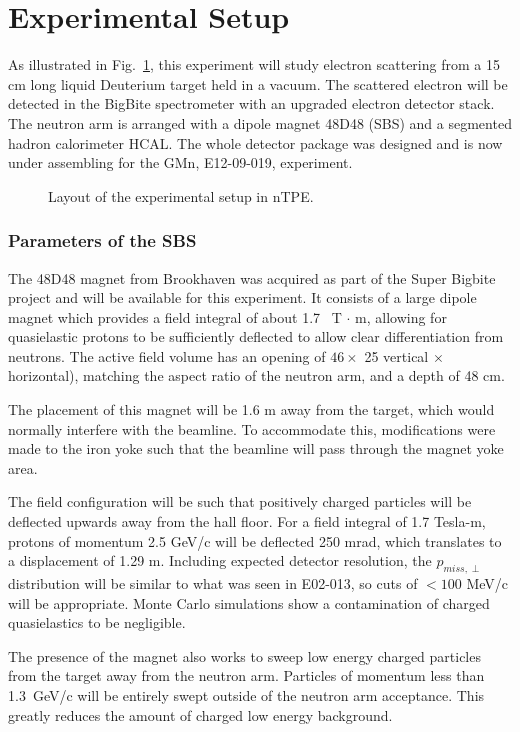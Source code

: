 \section{Experimental Setup}
%
\label{sec:expsetup}

As illustrated in Fig.~\ref{pic:expsetup}, this experiment will study electron scattering from a 15 cm long 
liquid Deuterium target held in a vacuum.
The scattered electron will be detected in the BigBite spectrometer with an upgraded electron detector stack. 
The neutron arm is arranged with a dipole magnet 48D48 (SBS) and a segmented hadron calorimeter HCAL.  
The whole detector package was designed and is now under assembling for the GMn, E12-09-019, experiment. 

\begin{figure}[bh]
	\caption{Layout of the experimental setup in nTPE.}	
\label{pic:expsetup}
\end{figure}

\subsubsection{Parameters of the SBS}

The 48D48 magnet from Brookhaven was acquired as part of the Super Bigbite project and will be available for this experiment.  
It consists of a large dipole magnet which provides a field integral of about 1.7~ T $\cdot$ m, allowing for quasielastic 
protons to be sufficiently deflected to allow clear differentiation from neutrons.  
The active field volume has an opening of $46 \times$ 25 vertical $\times$ horizontal), 
matching the aspect ratio of the neutron arm, and a depth of 48 cm.

The placement of this magnet will be 1.6 m away from the target, which would normally interfere with the beamline.  
To accommodate this, modifications were made to the iron yoke such that the beamline will pass through the magnet yoke area.

The field configuration will be such that positively charged particles will be deflected upwards away from the hall floor.  
For a field integral of 1.7 Tesla-m, protons of momentum 2.5 GeV/c will be deflected 250 mrad,
 which translates to a displacement of 1.29 m.  
 Including expected detector resolution,  the $p_{miss,\perp}$ distribution will be similar to 
 what was seen in E02-013, so cuts of  $< 100$ MeV/c will be appropriate.  
Monte Carlo simulations show a contamination of charged quasielastics to be negligible.

The presence of the magnet also works to sweep low energy charged particles from the target away from the neutron arm.  
Particles of momentum less than 1.3~{GeV/c} will be entirely swept outside of the neutron arm acceptance.  
This greatly reduces the amount of charged low energy background.
%

